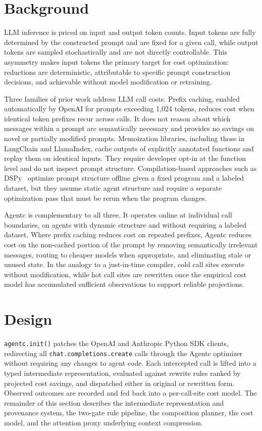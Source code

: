 \documentclass[sigconf,9pt]{acmart}
\begin{document}
\section{Background}
\label{sec:background}

LLM inference is priced on input and output token counts. Input tokens are fully
determined by the constructed prompt and are fixed for a given call, while output
tokens are sampled stochastically and are not directly controllable. This asymmetry
makes input tokens the primary target for cost optimization: reductions are
deterministic, attributable to specific prompt construction decisions, and achievable
without model modification or retraining.

Three families of prior work address LLM call costs. Prefix caching, enabled
automatically by OpenAI for prompts exceeding 1,024 tokens, reduces cost when
identical token prefixes recur across calls. It does not reason about which messages
within a prompt are semantically necessary and provides no savings on novel or
partially modified prompts. Memoization libraries, including those in LangChain and
LlamaIndex, cache outputs of explicitly annotated functions and replay them on
identical inputs. They require developer opt-in at the function level and do not
inspect prompt structure. Compilation-based approaches such as
DSPy~\cite{khattab2024dspy} optimize prompt structure offline given a fixed program
and a labeled dataset, but they assume static agent structure and require a separate
optimization pass that must be rerun when the program changes.

Agentc is complementary to all three. It operates online at individual call
boundaries, on agents with dynamic structure and without requiring a labeled dataset.
Where prefix caching reduces cost on repeated prefixes, Agentc reduces cost on the
non-cached portion of the prompt by removing semantically irrelevant messages, routing
to cheaper models when appropriate, and eliminating stale or unused state. In the
analogy to a just-in-time compiler, cold call sites execute without modification,
while hot call sites are rewritten once the empirical cost model has accumulated
sufficient observations to support reliable projections.

\section{Design}
\label{sec:design}

\texttt{agentc.init()} patches the OpenAI and Anthropic Python SDK clients,
redirecting all \texttt{chat.completions.create} calls through the Agentc optimizer
without requiring any changes to agent code. Each intercepted call is lifted into a
typed intermediate representation, evaluated against rewrite rules ranked by projected
cost savings, and dispatched either in original or rewritten form. Observed outcomes
are recorded and fed back into a per-call-site cost model. The remainder of this
section describes the intermediate representation and provenance system, the two-gate
rule pipeline, the composition planner, the cost model, and the attention proxy
underlying context compression.
\end{document}
